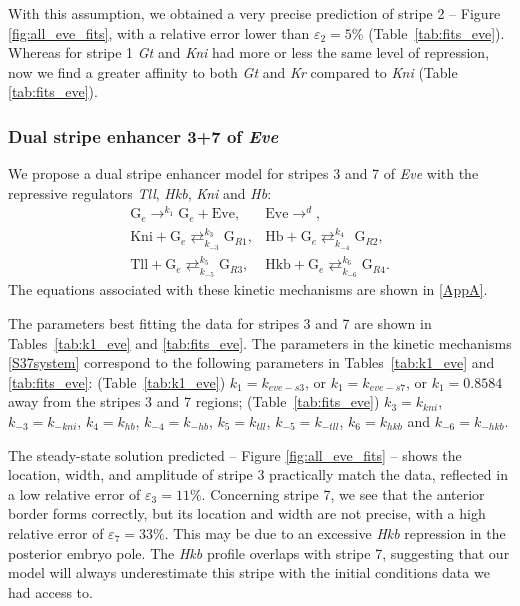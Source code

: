 \documentclass[final,authoryear, 5p, times]{elsarticle}
\begin{document}
With this assumption, we obtained a very precise prediction of stripe 2 -- Figure \ref{fig:all_eve_fits}, with a relative error lower than $\varepsilon_2=5\%$ (Table~\ref{tab:fits_eve}). Whereas for stripe 1 \textit{Gt} and \textit{Kni} had more or less the same level of repression, now we find a greater affinity to both \textit{Gt} and \textit{Kr} compared to \textit{Kni} (Table \ref{tab:fits_eve}).

\subsubsection{Dual stripe enhancer 3+7 of \textit{Eve}}

We propose a dual stripe enhancer model for stripes 3 and 7 of \textit{Eve} with the repressive regulators \textit{Tll}, \textit{Hkb}, \textit{Kni} and \textit{Hb}:
\begin{equation} \label{S37system}
    \begin{array}{ll}
        \displaystyle
        \text{G}_e \mathop{\longrightarrow}^{k_{1}} \text{G}_e + \text{Eve}, & \displaystyle
        \text{Eve} \mathop{\longrightarrow}^{d} , \\\displaystyle 
        \text{Kni} + \text{G}_e \mathop{\rightleftarrows}^{k_{3}}_{k_{-3}} \text{G}_{R1}, & \displaystyle
       \text{Hb} + \text{G}_e \mathop{\rightleftarrows}^{k_{4}}_{k_{-4}} \text{G}_{R2},\\\displaystyle 
        \text{Tll} + \text{G}_e \mathop{\rightleftarrows}^{k_{5}}_{k_{-5}} \text{G}_{R3}, & \displaystyle
        \text{Hkb} + \text{G}_e \mathop{\rightleftarrows}^{k_{6}}_{k_{-6}} \text{G}_{R4}.
    \end{array}
\end{equation}
The equations associated with these kinetic mechanisms are shown in \ref{AppA}.

The parameters best fitting the data for stripes 3 and 7 are shown in Tables~\ref{tab:k1_eve} and \ref{tab:fits_eve}. 
The parameters in the kinetic mechanisms \eqref{S37system} correspond to the following parameters in Tables~\ref{tab:k1_eve} and \ref{tab:fits_eve}: (Table~\ref{tab:k1_eve}) $k_1=k_{eve-s3}$, or $k_1=k_{eve-s7}$, or $k_1=0.8584$ away from the stripes 3 and 7 regions; (Table~\ref{tab:fits_eve}) $k_3=k_{kni}$, $k_{-3}=k_{-kni}$, $k_4=k_{hb}$, $k_{-4}=k_{-hb}$, $k_5=k_{tll}$, $k_{-5}=k_{-tll}$, $k_6=k_{hkb}$ and $k_{-6}=k_{-hkb}$.


The steady-state solution predicted -- Figure \ref{fig:all_eve_fits} -- shows the location, width, and amplitude of stripe 3 practically match the data, reflected in a low relative error of   $\varepsilon_3=11\%$. Concerning stripe 7, we see that the anterior border forms correctly, but its location and width are not precise, with a high relative error of  $\varepsilon_7=33\%$. This may be due to an excessive \textit{Hkb} repression in the posterior embryo pole. The \textit{Hkb} profile overlaps with stripe 7, suggesting that our model will always underestimate this stripe with the initial conditions data we had access to. 
\end{document}
